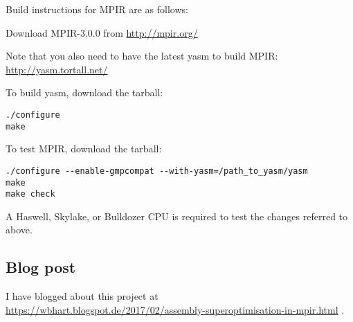Build instructions for MPIR are as follows:

Download MPIR-3.0.0 from \url{http://mpir.org/}

Note that you also need to have the latest yasm to build MPIR:
\url{http://yasm.tortall.net/}

To build yasm, download the tarball:

\begin{verbatim}
./configure
make
\end{verbatim}

To test MPIR, download the tarball:

\begin{verbatim}
./configure --enable-gmpcompat --with-yasm=/path_to_yasm/yasm
make
make check
\end{verbatim}

A Haswell, Skylake, or Bulldozer CPU is required to test the changes
referred to above.

\subsection{Blog post}\label{blog-post}

I have blogged about this project at
\url{https://wbhart.blogspot.de/2017/02/assembly-superoptimisation-in-mpir.html}
.
